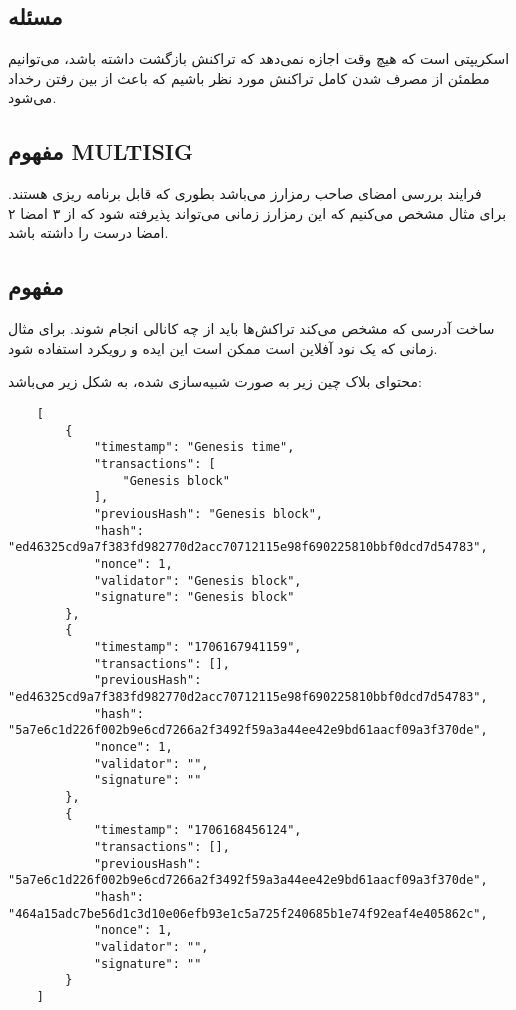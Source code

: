 \documentclass[10pt, a4paper]{article}
\begin{document}
\subsection{مسئله }

اسکریپتی است که هیچ وقت اجازه نمی‌دهد که تراکنش بازگشت داشته باشد، می‌توانیم
مطمئن از مصرف شدن کامل تراکنش مورد نظر باشیم که باعث از بین رفتن رخداد
 می‌شود.

\subsection{مفهوم MULTISIG}

فرایند بررسی امضای صاحب رمزارز می‌باشد بطوری که قابل برنامه ریزی هستند. برای
مثال مشخص می‌کنیم که این رمزارز زمانی می‌تواند پذیرفته شود که از ۳ امضا ۲ امضا
درست را داشته باشد.

\subsection{مفهوم }

ساخت آدرسی که مشخص می‌کند تراکش‌ها باید از چه کانالی انجام شوند. برای مثال زمانی
که یک نود آفلاین است ممکن است این ایده و رویکرد استفاده شود.

محتوای بلاک چین زیر به صورت شبیه‌سازی شده، به شکل زیر می‌باشد:

\begin{LTR}
    \begin{lstlisting}
    [
        {
            "timestamp": "Genesis time",
            "transactions": [
                "Genesis block"
            ],
            "previousHash": "Genesis block",
            "hash": "ed46325cd9a7f383fd982770d2acc70712115e98f690225810bbf0dcd7d54783",
            "nonce": 1,
            "validator": "Genesis block",
            "signature": "Genesis block"
        },
        {
            "timestamp": "1706167941159",
            "transactions": [],
            "previousHash": "ed46325cd9a7f383fd982770d2acc70712115e98f690225810bbf0dcd7d54783",
            "hash": "5a7e6c1d226f002b9e6cd7266a2f3492f59a3a44ee42e9bd61aacf09a3f370de",
            "nonce": 1,
            "validator": "",
            "signature": ""
        },
        {
            "timestamp": "1706168456124",
            "transactions": [],
            "previousHash": "5a7e6c1d226f002b9e6cd7266a2f3492f59a3a44ee42e9bd61aacf09a3f370de",
            "hash": "464a15adc7be56d1c3d10e06efb93e1c5a725f240685b1e74f92eaf4e405862c",
            "nonce": 1,
            "validator": "",
            "signature": ""
        }
    ]
    \end{lstlisting}
\end{LTR}
\end{document}

